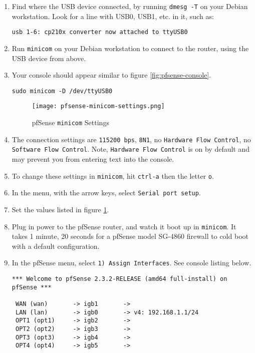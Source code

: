\begin{enumerate}
 \item Find where the USB device connected, by running \texttt{dmesg -T} on your Debian workstation.
Look for a line with USB0, USB1, etc. in it, such as:
\begin{verbatim}
usb 1-6: cp210x converter now attached to ttyUSB0
\end{verbatim}
 \item Run \texttt{minicom} on your Debian workstation to connect to the router, using the USB device from above.
 \item Your console should appear similar to figure \ref{fig:pfsense-console}.
\begin{verbatim}
sudo minicom -D /dev/ttyUSB0
\end{verbatim}

\begin{figure}[h!]
\begin{center}
\texttt{[image: pfsense-minicom-settings.png]}
 \caption{pfSense \texttt{minicom} Settings}
 \label{fig:pfsense-minicom-settings}
\end{center}
\end{figure}
 \item The connection settings are \texttt{115200 bps}, \texttt{8N1}, no \texttt{Hardware Flow Control}, no \texttt{Software Flow Control}. Note, \texttt{Hardware Flow Control} is on by default and may prevent you from entering text into the console.
 \item To change these settings in \texttt{minicom}, hit \texttt{ctrl-a} then the letter \texttt{o}.
 \item In the menu, with the arrow keys, select \texttt{Serial port setup}.
 \item Set the values listed in figure \ref{fig:pfsense-minicom-settings}.
 \item Plug in power to the pfSense router, and watch it boot up in \texttt{minicom}. It takes 1 minute, 20 seconds for a pfSense model SG-4860 firewall to cold boot with a default configuration.
 \item In the pfSense menu, select \texttt{1) Assign Interfaces}. See console listing below.
\begin{verbatim}
*** Welcome to pfSense 2.3.2-RELEASE (amd64 full-install) on pfSense ***

 WAN (wan)       -> igb1       -> 
 LAN (lan)       -> igb0       -> v4: 192.168.1.1/24
 OPT1 (opt1)     -> igb2       -> 
 OPT2 (opt2)     -> igb3       -> 
 OPT3 (opt3)     -> igb4       -> 
 OPT4 (opt4)     -> igb5       -> 


\end{verbatim}
\end{enumerate}
